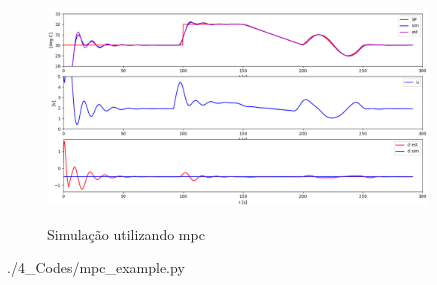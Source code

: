 \begin{figure}[h]
    \caption{Simulação utilizando \acrlong{mpc}}
	\begin{center}
        \includegraphics[width=0.9\textwidth]{./5_images/fig_mpc_example.png} 
		\label{fig:mpc_example}
	\end{center}
    \centering
\end{figure}


    {./4_Codes/mpc_example.py}
    \begin{center}
    \end{center}